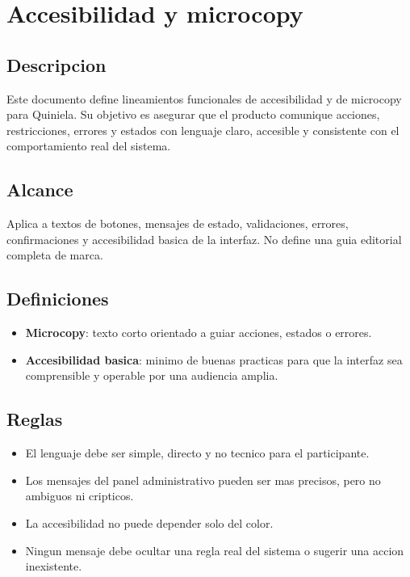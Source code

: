 \section{Accesibilidad y microcopy}

\subsection{Descripcion}

Este documento define lineamientos funcionales de accesibilidad y de microcopy para Quiniela. Su objetivo es asegurar que el producto comunique acciones, restricciones, errores y estados con lenguaje claro, accesible y consistente con el comportamiento real del sistema.

\subsection{Alcance}

Aplica a textos de botones, mensajes de estado, validaciones, errores, confirmaciones y accesibilidad basica de la interfaz. No define una guia editorial completa de marca.

\subsection{Definiciones}

\begin{itemize}
  \item \textbf{Microcopy}: texto corto orientado a guiar acciones, estados o errores.
  \item \textbf{Accesibilidad basica}: minimo de buenas practicas para que la interfaz sea comprensible y operable por una audiencia amplia.
\end{itemize}

\subsection{Reglas}

\begin{itemize}
  \item El lenguaje debe ser simple, directo y no tecnico para el participante.
  \item Los mensajes del panel administrativo pueden ser mas precisos, pero no ambiguos ni cripticos.
  \item La accesibilidad no puede depender solo del color.
  \item Ningun mensaje debe ocultar una regla real del sistema o sugerir una accion inexistente.
\end{itemize}

